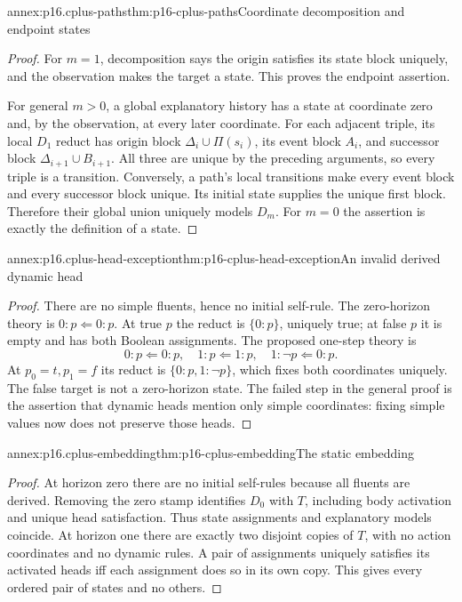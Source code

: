 \begin{annexitem}{annex:p16.cplus-paths}{thm:p16-cplus-paths}{Coordinate decomposition and endpoint states}
\begin{proof}
For \(m=1\), decomposition says the origin satisfies its state block
uniquely, and the observation makes the target a state.
This proves the endpoint assertion.

For general \(m>0\), a global explanatory history has a state at
coordinate zero and, by the observation, at every later coordinate.
For each adjacent triple, its local \(D_1\) reduct has origin block
\(\Delta_i\cup\Pi(s_i)\), its event block \(A_i\), and successor block
\(\Delta_{i+1}\cup B_{i+1}\). All three are unique by the preceding
arguments, so every triple is a transition.
Conversely, a path's local transitions make every event block and
every successor block unique. Its initial state supplies the unique
first block. Therefore their global union uniquely models \(D_m\).
For \(m=0\) the assertion is exactly the definition of a state.
\end{proof}
\end{annexitem}

\begin{annexitem}{annex:p16.cplus-head-exception}{thm:p16-cplus-head-exception}{An invalid derived dynamic head}
\begin{proof}
There are no simple fluents, hence no initial self-rule.
The zero-horizon theory is \(0:p\Leftarrow0:p\).
At true \(p\) the reduct is \(\{0:p\}\), uniquely true; at false
\(p\) it is empty and has both Boolean assignments.
The proposed one-step theory is
\[
 0:p\Leftarrow0:p,\quad1:p\Leftarrow1:p,\quad
                                  1:\neg p\Leftarrow0:p.
\]
At \(p_0=t,p_1=f\) its reduct is \(\{0:p,1:\neg p\}\),
which fixes both coordinates uniquely.
The false target is not a zero-horizon state. The failed step in the
general proof is the assertion that dynamic heads mention only simple
coordinates: fixing simple values now does not preserve those heads.
\end{proof}
\end{annexitem}

\begin{annexitem}{annex:p16.cplus-embedding}{thm:p16-cplus-embedding}{The static embedding}
\begin{proof}
At horizon zero there are no initial self-rules because all fluents
are derived. Removing the zero stamp identifies \(D_0\) with \(T\),
including body activation and unique head satisfaction.
Thus state assignments and explanatory models coincide.
At horizon one there are exactly two disjoint copies of \(T\), with
no action coordinates and no dynamic rules. A pair of assignments
uniquely satisfies its activated heads iff each assignment does so
in its own copy. This gives every ordered pair of states and no others.
\end{proof}
\end{annexitem}

